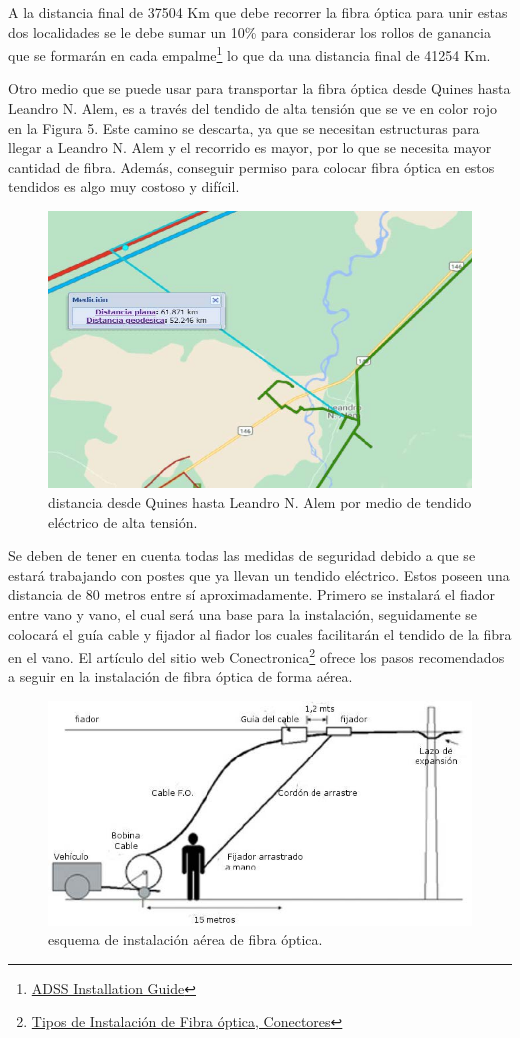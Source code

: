 \documentclass[11pt,a4paper]{article}
\begin{document}
A la distancia final de 37504 Km que debe recorrer la fibra óptica para unir estas dos localidades se le debe sumar un 10\% para considerar los rollos de ganancia que se formarán en cada empalme\footnote{\href{https://www.teldor.com/files.php?actions=show&id=7655}{ADSS Installation Guide}} lo que da una distancia final de 41254 Km.

Otro medio que se puede usar para transportar la fibra óptica desde Quines hasta Leandro N. Alem, es a través del tendido de alta tensión que se ve en color rojo en la Figura 5.
Este camino se descarta, ya que se necesitan estructuras para llegar a Leandro N. Alem y el recorrido es mayor, por lo que se necesita mayor cantidad de fibra. 
Además, conseguir permiso para colocar fibra óptica en estos tendidos es algo muy costoso y difícil.

\begin{figure}[htbp]
  \centering
  \includegraphics[width=0.5\linewidth]{fotos_ema/dist_quines_alem_tend_alta_v.jpg}
  \caption{distancia desde Quines hasta Leandro N. Alem por medio de tendido eléctrico de alta tensión.}
  \label{fig:dist_quines_alem_tend_alta_v}
\end{figure}

Se deben de tener en cuenta todas las medidas de seguridad debido a que se estará trabajando con postes que ya llevan un tendido eléctrico. 
Estos poseen una distancia de 80 metros entre sí aproximadamente. 
Primero se instalará el fiador entre vano y vano, el cual será una base para la instalación, seguidamente se colocará el guía cable y fijador al fiador los cuales facilitarán el tendido de la fibra en el vano. 
El artículo del sitio web Conectronica\footnote{\href{https://www.conectronica.com/fibra-optica/curso-fibra-optica/tipos-de-instalacion-de-fibra-optica}{Tipos de Instalación de Fibra óptica, Conectores}} ofrece los pasos recomendados a seguir en la instalación de fibra óptica de forma aérea.

\begin{figure}[htbp]
  \centering
  \includegraphics[width=0.7\linewidth]{fotos_ema/esq_inst_fo.jpg}
  \caption{esquema de instalación aérea de fibra óptica.}
  \label{fig:esq_inst_fo}
\end{figure}
\end{document}
